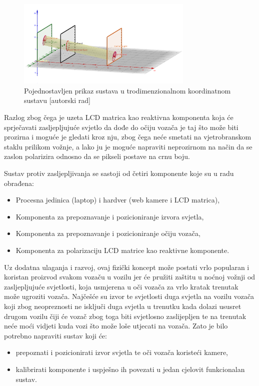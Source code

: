 \documentclass{foi}
\begin{document}
\begin{figure}[h!]
    \centering
    \includegraphics[width=0.75\textwidth]{slike/graf_uvod}
    \caption{Pojednostavljen prikaz sustava u trodimenzionalnom koordinatnom sustavu [autorski rad]}
    \label{fig:prikaz_sustava_1}
\end{figure}

Razlog zbog čega je uzeta LCD matrica kao reaktivna komponenta koja će sprječavati zasljepljujuće svjetlo da dođe do očiju vozača je taj što može biti prozirna i moguće je gledati kroz nju, zbog čega neće smetati na vjetrobranskom staklu prilikom vožnje, a lako ju je moguće napraviti neprozirnom na način da se zaslon polarizira odnosno da se pikseli postave na crnu boju.

\begin{flushleft}Sustav protiv zasljepljivanja se sastoji od četiri komponente koje su u radu obrađena:\end{flushleft}
\begin{itemize}[noitemsep]
    \item Procesna jedinica (laptop) i hardver (web kamere i LCD matrica),
    \item Komponenta za prepoznavanje i pozicioniranje izvora svjetla,
    \item Komponenta za prepoznavanje i pozicioniranje očiju vozača,
    \item Komponenta za polarizaciju LCD matrice kao reaktivne komponente.
\end{itemize}

Uz dodatna ulaganja i razvoj, ovaj fizički koncept može postati vrlo popularan i koristan proizvod svakom vozaču u vozilu jer će pružiti zaštitu u noćnoj vožnji od zasljepljujuće svjetlosti, koja usmjerena u oči vozača za vrlo kratak trenutak može ugroziti vozača. Najčešće su izvor te svjetlosti duga svjetla na vozilu vozača koji zbog neopreznosti ne isključi duga svjetla u trenutku kada dolazi ususret drugom vozilu čiji će vozač zbog toga biti svjetlosno zaslijepljen te na trenutak neće moći vidjeti kuda vozi što može loše utjecati na vozača. Zato je bilo potrebno napraviti sustav koji će:
\begin{itemize}[noitemsep]
    \item prepoznati i pozicionirati izvor svjetla te oči vozača koristeći kamere,
    \item kalibrirati komponente i uspješno ih povezati u jedan cjelovit funkcionalan sustav.
\end{itemize}
\end{document}
